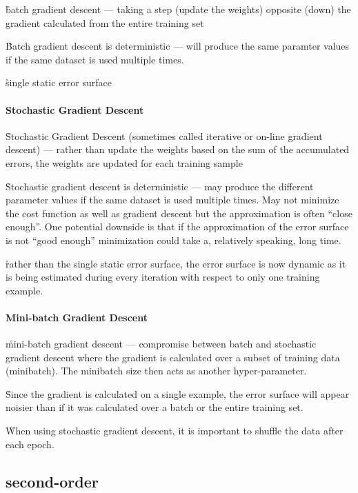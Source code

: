 \r{batch gradient descent --- taking a step (update the weights) opposite (down) the gradient calculated from the entire training set}

\r{Batch gradient descent is deterministic --- will produce the same paramter values if the same dataset is used multiple times.}

\r{single static error surface}


\paragraph{Stochastic Gradient Descent}

\r{Stochastic Gradient Descent (sometimes called iterative or on-line gradient descent) --- rather than update the weights based on the sum of the accumulated errors, the weights are updated for each training sample}

\r{Stochastic gradient descent is deterministic --- may produce the different parameter values if the same dataset is used multiple times. May not minimize the cost function as well as gradient descent but the approximation is often ``close enough''. One potential downside is that if the approximation of the error surface is not ``good enough'' minimization could take a, relatively speaking, long time.}

\r{rather than the single static error surface, the error surface is now dynamic as it is being estimated during every iteration with respect to only one training example.}


\paragraph{Mini-batch Gradient Descent}

\r{mini-batch gradient descent --- compromise between batch and stochastic gradient descent where the gradient is calculated over a subset of training data (minibatch). The minibatch size then acts as another hyper-parameter.}

\r{Since the gradient is calculated on a single example, the error surface will appear noisier than if it was calculated over a batch or the entire training set.}

\r{When using stochastic gradient descent, it is important to shuffle the data after each epoch.}



\subsection{second-order}

